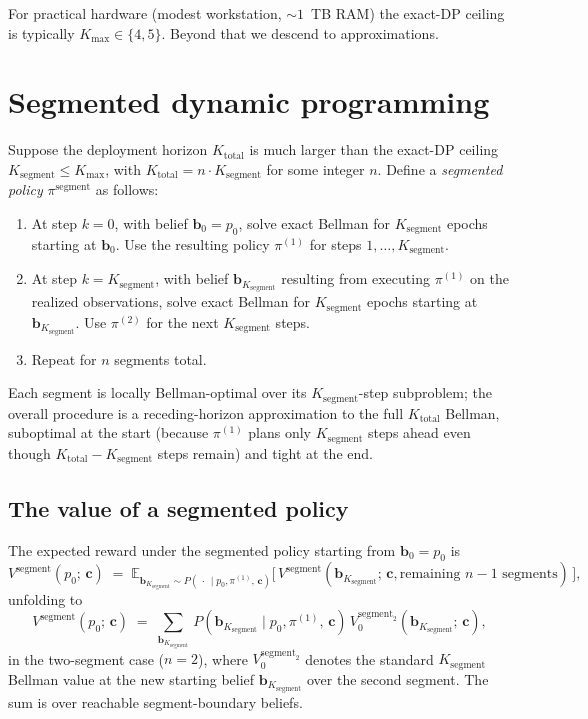 \documentclass[11pt,a4paper]{article}
\newcommand{\bc}{\bm{c}}
\newcommand{\bb}{\bm{b}}
\newcommand{\E}{\mathbb{E}}
\begin{document}
For practical hardware (modest workstation, $\sim 1$~TB RAM) the exact-DP ceiling is
typically $K_\mathrm{max} \in \{4, 5\}$.  Beyond that we descend to approximations.

\section{Segmented dynamic programming}
\label{sec:segmented}

Suppose the deployment horizon $K_\mathrm{total}$ is much larger than the exact-DP ceiling
$K_\mathrm{segment} \le K_\mathrm{max}$, with $K_\mathrm{total} = n \cdot K_\mathrm{segment}$
for some integer $n$.  Define a \emph{segmented policy} $\pi^\mathrm{segment}$ as follows:

\begin{enumerate}[nosep, leftmargin=2em]
\item At step $k = 0$, with belief $\bb_0 = p_0$, solve exact Bellman for $K_\mathrm{segment}$
      epochs starting at $\bb_0$.  Use the resulting policy $\pi^{(1)}$ for steps $1, \ldots, K_\mathrm{segment}$.
\item At step $k = K_\mathrm{segment}$, with belief $\bb_{K_\mathrm{segment}}$ resulting from
      executing $\pi^{(1)}$ on the realized observations, solve exact Bellman for $K_\mathrm{segment}$
      epochs starting at $\bb_{K_\mathrm{segment}}$.  Use $\pi^{(2)}$ for the next $K_\mathrm{segment}$ steps.
\item Repeat for $n$ segments total.
\end{enumerate}

Each segment is locally Bellman-optimal over its $K_\mathrm{segment}$-step subproblem; the
overall procedure is a receding-horizon approximation to the full $K_\mathrm{total}$
Bellman, suboptimal at the start (because $\pi^{(1)}$ plans only $K_\mathrm{segment}$ steps
ahead even though $K_\mathrm{total} - K_\mathrm{segment}$ steps remain) and tight at the end.

\subsection{The value of a segmented policy}

The expected reward under the segmented policy starting from $\bb_0 = p_0$ is
\begin{equation}
V^\mathrm{segment}(p_0;\, \bc)
\;=\;
\E_{\bb_{K_\mathrm{segment}} \sim P(\,\cdot\,\mid p_0, \pi^{(1)},\, \bc)}\!
\bigl[\,V^\mathrm{segment}(\bb_{K_\mathrm{segment}};\, \bc, \text{remaining } n - 1 \text{ segments})\,\bigr],
\label{eq:Vseg_recursive}
\end{equation}
unfolding to
\begin{equation}
V^\mathrm{segment}(p_0;\, \bc)
\;=\;
\sum_{\bb_{K_\mathrm{segment}}}\, P(\bb_{K_\mathrm{segment}} \mid p_0, \pi^{(1)},\, \bc)\,
V_0^{\mathrm{segment}_2}(\bb_{K_\mathrm{segment}};\, \bc),
\label{eq:Vseg_2seg}
\end{equation}
in the two-segment case ($n = 2$), where $V_0^{\mathrm{segment}_2}$ denotes the standard
$K_\mathrm{segment}$ Bellman value at the new starting belief $\bb_{K_\mathrm{segment}}$ over
the second segment.  The sum is over reachable segment-boundary beliefs.
\end{document}
